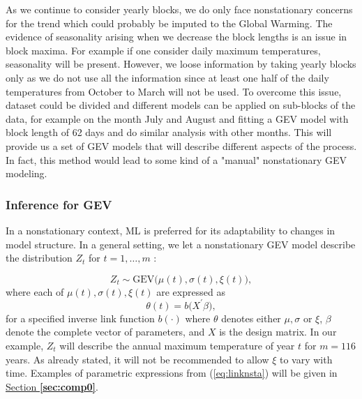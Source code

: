 As we continue to consider yearly blocks, we do only face nonstationary concerns for the trend which could probably be imputed to the Global Warming. 
The evidence of seasonality arising when we decrease the block lengths is an issue in block maxima. For example if one consider daily maximum temperatures, seasonality will be present.
 However, we loose information by taking yearly blocks only as we do not use all the information since at least one half of the daily temperatures from October to March will not be used. To overcome this issue, dataset could be divided and different models can be applied on sub-blocks of the data, for example on the month July and August and fitting a GEV model with block length of 62 days and do similar analysis with other months. This will provide us a set of GEV models that will  describe different aspects of the process. In fact, this method would lead to some kind of a "manual" nonstationary GEV modeling.


\subsubsection*{Inference for GEV}

In a nonstationary context, ML is preferred for its adaptability to changes in model structure. In a general setting, we let a nonstationary GEV model describe the distribution $Z_t$ for $t=1,\ldots,m$ :

\begin{equation}\label{eq:gevnsta}
Z_t\sim \text{GEV}\big(\mu(t), \sigma(t),\xi(t)\big),
\end{equation}
where each of $\mu(t),\sigma(t), \xi(t)$ are expressed as 
\begin{equation}\label{eq:linknsta}
\theta(t)=b\big(X^{'}\beta\big),
\end{equation}
for a specified inverse link function $b(\cdot)$ where $\theta$ denotes either $\mu,\sigma$ or $\xi$, $\beta$ denote the complete vector of parameters, and $X$ is the design matrix. In our example, $Z_t$ will describe the annual maximum temperature of year $t$ for $m=116$ years.
As already stated, it will not be recommended to allow $\xi$ to vary with time. Examples of parametric expressions from (\ref{eq:linknsta}) will be given in \hyperref[sec:comp0]{Section \textbf{\ref{sec:comp0}}}.

